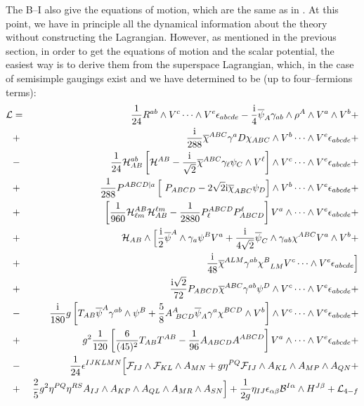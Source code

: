 \documentclass[a4paper,12pt]{article}
\def\bar{\overline}\end {picture}}
\begin{document}
\par
The B--I also give the equations of motion, which are the same as
in \cite{gunwar}. At this point, we have in principle all the
dynamical information about the theory without constructing the
Lagrangian. However, as mentioned in the previous section, in
order to get the equations of motion and the scalar potential, the
easiest way is to derive them from the superspace Lagrangian,
which, in the case of semisimple gaugings exist and we have
determined to be (up to four--fermions terms):
\begin{eqnarray}
\mathcal{L} &=& \frac{1}{24} R^{ab}\wedge V^c \cdots\wedge V^e
\epsilon_{abcde} -{{\rm i}\over 4} \bar\psi_A\gamma_{ab}
\wedge\rho^A\wedge V^a \wedge V^b +
 \nonumber\\
 &+&\frac{\rm i}{288}\bar\chi^{ABC}\gamma^a D
\chi_{ABC}\wedge V^b\cdots\wedge V^e \epsilon_{abcde} +
\nonumber\\
&-&{1\over 24} \mathcal{H}^{ab}_{AB}\left[\mathcal{H}^{AB} -
\frac{{\rm i}}{\sqrt{2}}\bar\chi^{ABC}\gamma_\ell\psi_C \wedge
V^\ell \right]\wedge V^c\cdots \wedge V^e \epsilon_{abcde}+
\nonumber\\
 &+& \frac{1}{288}
P^{ABCD\vert a}\left[ \ P_{ABCD} - 2\sqrt{2}{\rm i}
\bar\chi_{ABC}\psi_{D}\right] \wedge V^b\cdots \wedge V^e
\epsilon_{abcde}+
 \nonumber\\
&+&\left[{1\over 960} \mathcal{H}_{\ell m }^{AB}\mathcal{H}^{\ell
m}_{AB} -\frac{1}{2880} P^{ABCD}_{\ell}P_{ABCD}^\ell
\right]V^a\wedge \cdots\wedge V^e \epsilon_{abcde}+
\nonumber\\
&+&\mathcal{H}_{AB}\wedge\Bigl[\frac{\rm i}{2}
 \bar\psi^A\wedge\gamma_a\psi^B V^a + \frac{\rm i}{4\sqrt{2}}
\bar\psi_C\wedge\gamma_{ab} \chi^{ABC} V^a \wedge V^b +
\nonumber\\
&+& \frac{\rm i}{48}\bar\chi^{ALM}\gamma^{ab}\chi^B_{~~LM} V^c
\cdots \wedge V^e \epsilon_{abcde}
\Bigr]\nonumber\\
&+& \frac{\rm i\sqrt{2}}{72}
P_{ABCD}\bar\chi^{ABC}\gamma^{ab}\psi^D\wedge V^c \cdots
\wedge V^e \epsilon_{abcde} +\nonumber\\
 &-&
\frac{{\rm i}}{180}g \left[ T_{AB}\bar\psi^A \gamma^{ab}\wedge
\psi^B
 +\frac{5}{8}A^A_{~BCD}\bar\psi_{A}
 \gamma^a\chi^{BCD}\wedge V^b\right]\wedge V^c \cdots\wedge V^e \epsilon_{abcde}+
 \nonumber\\
&+& g^2\frac{1}{120}\left[{6\over (45)^2}T_{AB}T^{AB}-{1\over
  96}A_{ABCD}A^{ABCD}\right]V^a\wedge \cdots\wedge V^e
  \epsilon_{abcde}+
\nonumber\\
&-& \frac{1}{24}\epsilon^{IJKLMN} \Bigl[ {\cal F}_{IJ}\wedge {\cal
F}_{KL} \wedge A_{MN}
 +  g\eta^{PQ}{\cal F}_{IJ}\wedge A_{KL} \wedge A_{MP}\wedge A_{QN}
 +\nonumber\\
 &+& \frac{2}{5}
  g^2\eta^{PQ} \eta^{RS}A_{IJ}\wedge A_{KP} \wedge A_{QL}\wedge A_{MR}\wedge A_{SN}
 \Bigr]+
 \frac{1}{2g}\eta_{IJ}\epsilon_{\alpha\beta} {\cal B}^{I\alpha}\wedge
 H^{J\beta}
  + \mathcal{L}_{4-f}\nonumber\\
  \label{lagrangian}
\end{eqnarray}
\end{document}
